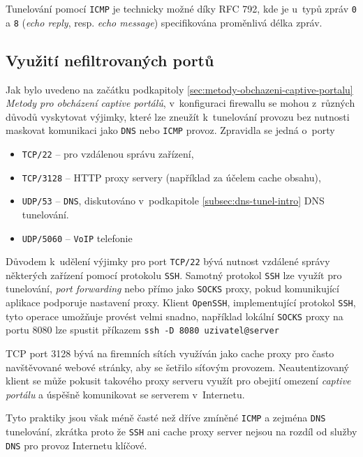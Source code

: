 \documentclass[thesis=M,czech]{FITthesis}[2012/10/20]
\begin{document}
Tunelování pomocí \texttt{ICMP} je technicky možné díky RFC 792\cite{rfc792}, kde je u~typů zpráv \texttt{0} a \texttt{8} (\textit{echo reply}, resp. \textit{echo message}) specifikována proměnlivá délka zpráv.

\subsection{Využití nefiltrovaných portů}
\label{subsec:nonfiltered-ports}
Jak bylo uvedeno na začátku podkapitoly \ref{sec:metody-obchazeni-captive-portalu} \textit{Metody pro obcházení captive portálů}, v~konfiguraci firewallu se mohou z~různých důvodů vyskytovat výjimky, které lze zneužít k~tunelování provozu bez nutnosti maskovat komunikaci jako \texttt{DNS} nebo \texttt{ICMP} provoz. Zpravidla\cite{defcon-captive-article} se jedná o~porty 

\begin{itemize}
 \item \texttt{TCP/22} -- pro vzdálenou správu zařízení,
 \item \texttt{TCP/3128} -- HTTP proxy servery (například za účelem cache obsahu),
 \item \texttt{UDP/53} -- \texttt{DNS}, diskutováno v~podkapitole \ref{subsec:dns-tunel-intro} DNS tunelování.
 \item \texttt{UDP/5060} -- \texttt{VoIP} telefonie
\end{itemize}

Důvodem k~udělení výjimky pro port \texttt{TCP/22} bývá nutnost vzdálené správy některých zařízení pomocí protokolu \texttt{SSH}. Samotný protokol \texttt{SSH} lze využít pro tunelování, \textit{port forwarding} nebo přímo jako \texttt{SOCKS} proxy, pokud komunikující aplikace podporuje nastavení proxy. Klient \texttt{OpenSSH}, implementující protokol \texttt{SSH}, tyto operace umožňuje provést velmi snadno, například lokální \texttt{SOCKS} proxy na portu 8080 lze spustit příkazem \texttt{ssh -D 8080 uzivatel@server}

TCP port 3128 bývá na firemních sítích využíván jako cache proxy pro často navštěvované webové stránky, aby se šetřilo síťovým provozem. Neautentizovaný klient se může pokusit takového proxy serveru využít pro obejití omezení \textit{captive portálu} a úspěšně komunikovat se serverem v~Internetu.

Tyto praktiky jsou však méně časté než dříve zmíněné \texttt{ICMP} a zejména \texttt{DNS} tunelování, zkrátka proto že \texttt{SSH} ani cache proxy server nejsou na rozdíl od služby \texttt{DNS} pro provoz Internetu klíčové.
\end{document}
